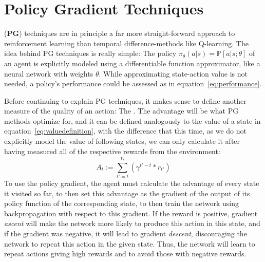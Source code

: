 

\section{Policy Gradient Techniques}

 (\textbf{PG}) techniques are in principle a far more straight-forward approach to reinforcement learning than temporal difference-methods like Q-learning. The idea behind PG techniques is really simple: The policy $\pi_\theta(a|s) = \mathds{P}[a|s;\theta]$ of an agent is explicitly modeled using a differentiable function approximator, like a neural network with weights $\theta$. While approximating state-action value is not needed, a policy's performance could be assessed as in equation~\ref{eq:performance}. 

Before continuing to explain PG techniques, it makes sense to define another measure of the quality of an action: The . The advantage will be what PG methods optimize for, and it can be defined analogously to the value of a state in equation~\ref{eq:valuedefinition}, with the difference that this time, as we do not explicitly model the value of following states, we can only calculate it after having measured all of the respective rewards from the environment:
\begin{equation}
	 A_t := \sum_{t'=t}^{t_t} ( \gamma^{t'-t} * r_{t'} ) 
\end{equation}
To use the policy gradient, the agent must calculate the advantage of every state it visited so far, to then set this advantage as the gradient of the output of its policy function of the corresponding state, to then train the network using backpropagation with respect to this gradient. If the reward is positive, gradient \textit{ascent} will make the network more likely to produce this action in this state, and if the gradient was negative, it will lead to gradient \textit{descent}, discouraging the network to repeat this action in the given state. Thus, the network will learn to repeat actions giving high rewards and to avoid those with negative rewards.

